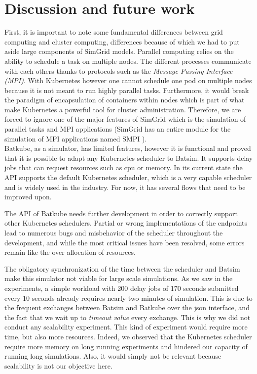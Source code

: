 \section{Discussion and future work}

First, it is important to note some fundamental differences between grid
computing and cluster computing, differences because of which we had to put
aside large components of SimGrid models. Parallel computing relies on the
ability to schedule a task on multiple nodes.  The different processes
communicate with each others thanks to protocols such as the \textit{Message
Passing Interface (MPI)}. With Kubernetes however one cannot schedule one pod
on multiple nodes because it is not meant to run highly parallel tasks.
Furthermore, it would break the paradigm of encapsulation of containers within
nodes which is part of what make Kubernetes a powerful tool for cluster
administration.  Therefore, we are forced to ignore one of the major features
of SimGrid which is the simulation of parallel tasks and MPI applications
(SimGrid has an entire module for the simulation of MPI applications named SMPI
\cite{casanova:hal-01017319}).\\

Batkube, as a simulator, has limited features, however it is functional and
proved that it is possible to adapt any Kubernetes scheduler to Batsim. It
supports delay jobs that can request resources such as cpu or memory. In its
current state the API supports the default Kubernetes scheduler, which is  a
very capable scheduler and is widely used in the industry. For now, it has several flows that need to be improved upon.

The API of Batkube needs further development in order to correctly support
other Kubernetes schedulers. Partial or wrong implementations of the endpoints
lead to numerous bugs and misbehavior of the scheduler throughout the
development, and while the most critical issues have been resolved, some errors
remain like the over allocation of resources.

The obligatory synchronization of the time between the scheduler and Batsim
make this simulator not viable for large scale simulations. As we saw in the
experiments, a simple workload with 200 delay jobs of 170 seconds submitted
every 10 seconds already requires nearly two minutes of simulation. This is due
to the frequent exchanges between Batsim and Batkube over the json interface,
and the fact that we wait up to \textit{timeout value} every exchange. This is
why we did not conduct any scalability experiment. This kind of experiment
would require more time, but also more resources. Indeed, we observed that the
Kubernetes scheduler require more memory on long running experiments and
hindered our capacity of running long simulations. Also, it would simply not be
relevant because scalability is not our objective here.\\

